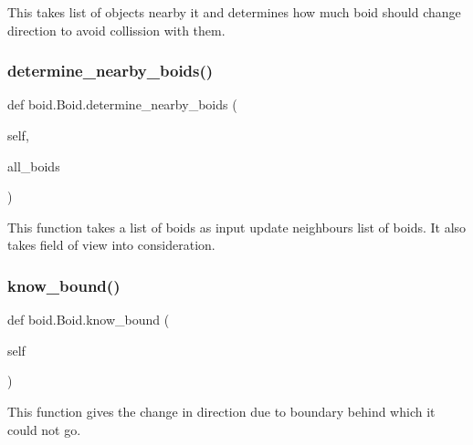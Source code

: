 \begin{DoxyVerb}This takes list of objects nearby it and determines how much boid should change direction to avoid collission with them.\end{DoxyVerb}
 \mbox{\label{classboid_1_1Boid_af50918fec659eb35307d69253ae89fe0}} 
\subsubsection{\texorpdfstring{determine\+\_\+nearby\+\_\+boids()}{determine\_nearby\_boids()}}
{\footnotesize\ttfamily def boid.\+Boid.\+determine\+\_\+nearby\+\_\+boids (\begin{DoxyParamCaption}\item[{}]{self,  }\item[{}]{all\+\_\+boids }\end{DoxyParamCaption})}

\begin{DoxyVerb}This function takes a list of boids as input update neighbours list of boids. It also takes field of view into consideration.\end{DoxyVerb}
 \mbox{\label{classboid_1_1Boid_aa9dc9d7da55ba1d25a58b71bb44f6c66}} 
\subsubsection{\texorpdfstring{know\+\_\+bound()}{know\_bound()}}
{\footnotesize\ttfamily def boid.\+Boid.\+know\+\_\+bound (\begin{DoxyParamCaption}\item[{}]{self }\end{DoxyParamCaption})}

\begin{DoxyVerb}This function gives the change in direction due to boundary behind which it could not go.\end{DoxyVerb}
 \mbox{\label{classboid_1_1Boid_a4bf32244bda6419e04158e1b724b9b7e}} 

